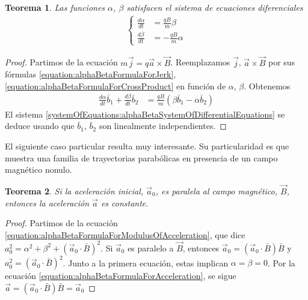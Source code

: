 \documentclass{article}
\newtheorem{theorem}{Teorema}
\begin{document}
  \begin{theorem}
    Las funciones \(\alpha\), \(\beta\) satisfacen el sistema de ecuaciones diferenciales
    \begin{align}
      \label{systemOfEquations:alphaBetaSystemOfDifferentialEquations}
      \left\{
        \begin{aligned}
          \frac{d \alpha}{d t} &= \frac{q B}{m} \beta
          \\
          \frac{d \beta}{d t} &= - \frac{q B}{m} \alpha
        \end{aligned}
      \right.
    \end{align}
  \end{theorem}
  \begin{proof}
    Partimos de la ecuación \(m \vec{j} = q \vec{a} \times \vec{B}\).
    Reemplazamos \(\vec{j}\), \(\vec{a} \times \vec{B}\) por sus fórmulas \eqref{equation:alphaBetaFormulaForJerk}, \eqref{equation:alphaBetaFormulaForCrossProduct} en función de \(\alpha\), \(\beta\).
    Obtenemos
    \begin{align}
      \frac{d \alpha}{d t} \bar{b}_1 + \frac{d \beta}{d t} \bar{b}_2
      &=
      \frac{q B}{m} (\beta \bar{b}_1 - \alpha \bar{b}_2)
    \end{align}
    El sistema \eqref{systemOfEquations:alphaBetaSystemOfDifferentialEquations} se deduce usando que \(\bar{b}_1\), \(\bar{b}_2\) son linealmente independientes.
  \end{proof}

  El siguiente caso particular resulta muy interesante.
  Su particularidad es que muestra una familia de trayectorias parabólicas en presencia de un campo magnético nonulo.
  \begin{theorem}
    \label{theorem:initialAccelerationIsParallelToMagneticField}
    Si la aceleración inicial, \(\vec{a}_0\), es paralela al campo magnético, \(\vec{B}\), entonces la aceleración \(\vec{a}\) es constante.
  \end{theorem}
  \begin{proof}
    Partimos de la ecuación \eqref{equation:alphaBetaFormulaForModulusOfAcceleration}, que dice \(
      a_0^2
      =
      \alpha^2 + \beta^2
      + (\vec{a}_0 \cdot \bar{B})^2
    \).
    Si \(\vec{a}_0\) es paralelo a \(\vec{B}\), entonces \(\vec{a}_0 = (\vec{a}_0 \cdot \bar{B}) \bar{B}\) y \(a_0^2 = (\vec{a}_0 \cdot \bar{B})^2\).
    Junto a la primera ecuación, estas implican \(\alpha = \beta = 0\).
    Por la ecuación \eqref{equation:alphaBetaFormulaForAcceleration}, se sigue \(\vec{a} = (\vec{a}_0 \cdot \bar{B}) \bar{B} = \vec{a}_0\)
  \end{proof}
\end{document}
